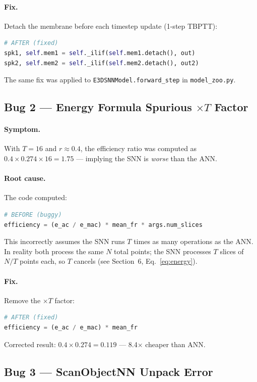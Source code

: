 \documentclass[11pt,a4paper]{article}
\begin{document}
\paragraph{Fix.} Detach the membrane before each timestep update (1-step TBPTT):
\begin{lstlisting}[language=Python]
# AFTER (fixed)
spk1, self.mem1 = self._ilif(self.mem1.detach(), out)
spk2, self.mem2 = self._ilif(self.mem2.detach(), out2)
\end{lstlisting}
The same fix was applied to \texttt{E3DSNNModel.forward\_step} in
\texttt{model\_zoo.py}.

\subsection{Bug 2 --- Energy Formula Spurious $\times T$ Factor}

\paragraph{Symptom.} With $T = 16$ and $r \approx 0.4$, the efficiency ratio
was computed as $0.4 \times 0.274 \times 16 = 1.75$ --- implying the SNN is
\emph{worse} than the ANN.

\paragraph{Root cause.} The code computed:
\begin{lstlisting}[language=Python]
# BEFORE (buggy)
efficiency = (e_ac / e_mac) * mean_fr * args.num_slices
\end{lstlisting}
This incorrectly assumes the SNN runs $T$ times as many operations as the ANN.
In reality both process the same $N$ total points; the SNN processes $T$ slices
of $N/T$ points each, so $T$ cancels (see Section~6, Eq.~\ref{eq:energy}).

\paragraph{Fix.} Remove the $\times T$ factor:
\begin{lstlisting}[language=Python]
# AFTER (fixed)
efficiency = (e_ac / e_mac) * mean_fr
\end{lstlisting}
Corrected result: $0.4 \times 0.274 = 0.119$ --- 8.4$\times$ cheaper than ANN.

\subsection{Bug 3 --- ScanObjectNN Unpack Error}
\end{document}
